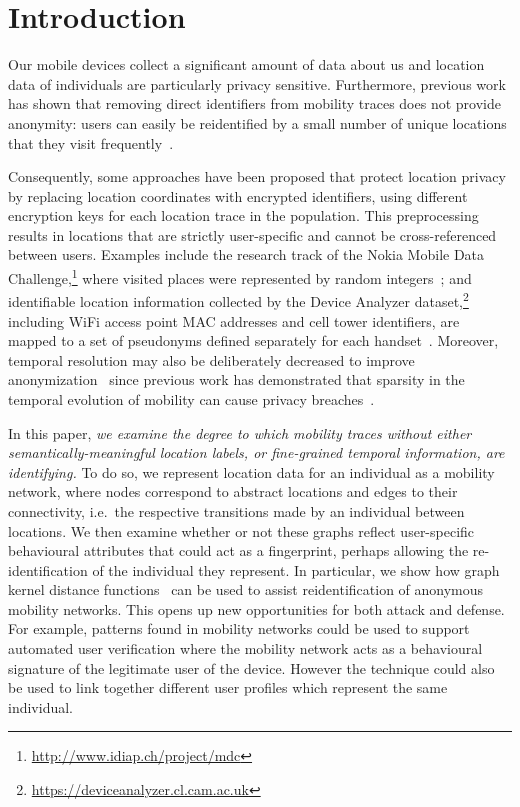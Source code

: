 \section{Introduction}

Our mobile devices collect a significant amount of data about us and location data of individuals are particularly privacy sensitive.
Furthermore, previous work has shown that removing direct identifiers from mobility traces does not provide anonymity: users can easily be reidentified by a small number of unique locations that they visit frequently~\cite{DeMontjoye2013, Zang2011}.

Consequently, some approaches have been proposed that protect location privacy by replacing location coordinates with encrypted identifiers, using different encryption keys for each location trace in the population.
This preprocessing results in locations that are strictly user-specific and cannot be cross-referenced between users.
Examples include the research track of the Nokia Mobile Data Challenge,\footnote{\url{http://www.idiap.ch/project/mdc}} where visited places were represented by random integers~\cite{Laurila}; and identifiable location information collected by the Device Analyzer dataset,\footnote{\url{https://deviceanalyzer.cl.cam.ac.uk}} including WiFi access point MAC addresses and cell tower identifiers, are mapped to a set of pseudonyms defined separately for each handset~\cite{Wagner2014}.
Moreover, temporal resolution may also be deliberately decreased to improve anonymization~\cite{Gruteser} since previous work has demonstrated that sparsity in the temporal evolution of mobility can cause privacy breaches~\cite{DeMontjoye2013}.

In this paper, \emph{we examine the degree to which mobility traces without either semantically-meaningful location labels, or fine-grained temporal information, are identifying.}
To do so, we represent location data for an individual as a mobility network, where nodes correspond to abstract locations and edges to their connectivity, i.e.\ the respective transitions made by an individual between locations.
We then examine whether or not these graphs reflect user-specific behavioural attributes that could act as a fingerprint, perhaps allowing the re-identification of the individual they represent.
In particular, we show how graph kernel distance functions~\cite{Vishwanathan2010} can be used to assist reidentification of anonymous mobility networks.
This opens up new opportunities for both attack and defense.
For example, patterns found in mobility networks could be used to support automated user verification where the mobility network acts as a behavioural signature of the legitimate user of the device.
However the technique could also be used to link together different user profiles which represent the same individual.


